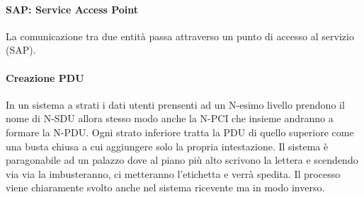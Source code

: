 \documentclass[12pt]{article}
\begin{document}
\paragraph{SAP: Service Access Point}
La comunicazione tra due entità passa attraverso un punto di accesso al servizio (SAP).

\paragraph{Creazione PDU}
In un sistema a strati i dati utenti prensenti ad un N-esimo livello prendono il nome di N-SDU allora stesso modo anche la N-PCI che insieme andranno a formare la N-PDU. Ogni strato inferiore tratta la PDU di quello superiore come una busta chiusa a cui aggiungere solo la propria intestazione. Il sistema è paragonabile ad un palazzo dove al piano più alto scrivono la lettera e scendendo via via la imbusteranno, ci metteranno l'etichetta e verrà spedita. Il processo viene chiaramente svolto anche nel sistema ricevente ma in modo inverso.
\end{document}
